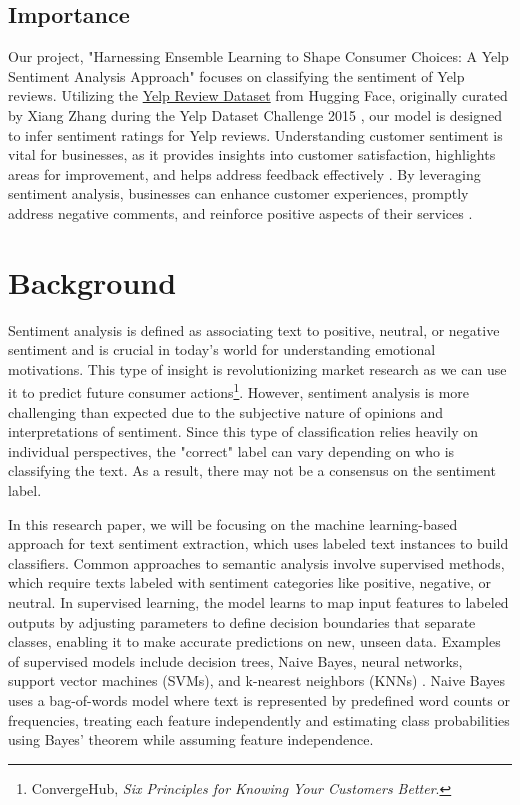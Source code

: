 \documentclass[11pt]{article}
\begin{document}
\subsection{Importance}
Our project, "Harnessing Ensemble Learning to Shape Consumer Choices: A Yelp Sentiment Analysis Approach" focuses on classifying the sentiment of Yelp reviews. Utilizing the \href{https://huggingface.co/datasets/Yelp/yelp_review_full}{Yelp Review Dataset} from Hugging Face, originally curated by Xiang Zhang during the Yelp Dataset Challenge 2015 \citep{zhang2015sensitivity}, our model is designed to infer sentiment ratings for Yelp reviews. Understanding customer sentiment is vital for businesses, as it provides insights into customer satisfaction, highlights areas for improvement, and helps address feedback effectively \citep{jurafsky2020speech}. By leveraging sentiment analysis, businesses can enhance customer experiences, promptly address negative comments, and reinforce positive aspects of their services \citep{pang2008sentiment}.

\section{Background}
Sentiment analysis is defined as associating text to positive, neutral, or negative sentiment and is crucial in today's world for understanding emotional motivations. This type of insight is revolutionizing market research as we can use it to predict future consumer actions\footnote{ConvergeHub, \textit{Six Principles for Knowing Your Customers Better}.}. However, sentiment analysis is more challenging than expected due to the subjective nature of opinions and interpretations of sentiment. Since this type of classification relies heavily on individual perspectives, the "correct" label can vary depending on who is classifying the text. As a result, there may not be a consensus on the sentiment label.

In this research paper, we will be focusing on the machine learning-based approach for text sentiment extraction, which uses labeled text instances to build classifiers. Common approaches to semantic analysis involve supervised methods, which require texts labeled with sentiment categories like positive, negative, or neutral. In supervised learning, the model learns to map input features to labeled outputs by adjusting parameters to define decision boundaries that separate classes, enabling it to make accurate predictions on new, unseen data. Examples of supervised models include decision trees, Naive Bayes, neural networks, support vector machines (SVMs), and k-nearest neighbors (KNNs) \citep{dankhara2022}. Naive Bayes uses a bag-of-words model where text is represented by predefined word counts or frequencies, treating each feature independently and estimating class probabilities using Bayes' theorem while assuming feature independence.
\end{document}
